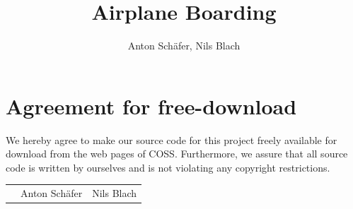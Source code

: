 \documentclass[11pt]{article}
\title{Airplane Boarding}
\author{Anton Schäfer, Nils Blach}
\begin{document}

\newpage


\newpage
\section*{Agreement for free-download}
\bigskip


\bigskip


\large We hereby agree to make our source code for this project freely available for download from the web pages of COSS. Furthermore, we assure that all source code is written by ourselves and is not violating any copyright restrictions.

\begin{center}

\bigskip


\bigskip


\begin{tabular}{@{}p{3.3cm}@{}p{6cm}@{}@{}p{6cm}@{}}
\begin{minipage}{3cm}

\end{minipage}
&
\begin{minipage}{6cm}
	\vspace{2mm} \large Anton Sch{\"a}fer

 \vspace{\baselineskip}

\end{minipage}
&
\begin{minipage}{6cm}

\large Nils Blach

\end{minipage}
\end{tabular}


\end{center}
\newpage







\tableofcontents

\newpage

\end{document}
